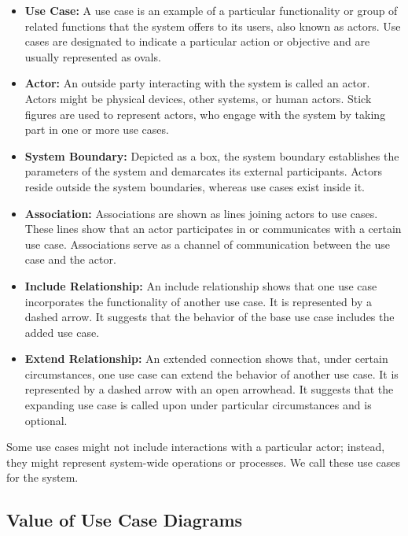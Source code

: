 \begin{itemize}
    \item \textbf{Use Case:} A use case is an example of a particular functionality or group of related functions that the system offers to its users, also known as actors. Use cases are designated to indicate a particular action or objective and are usually represented as ovals.

    \item \textbf{Actor:} An outside party interacting with the system is called an actor. Actors might be physical devices, other systems, or human actors. Stick figures are used to represent actors, who engage with the system by taking part in one or more use cases.

    \item \textbf{System Boundary:} Depicted as a box, the system boundary establishes the parameters of the system and demarcates its external participants. Actors reside outside the system boundaries, whereas use cases exist inside it.

    \item \textbf{Association:} Associations are shown as lines joining actors to use cases. These lines show that an actor participates in or communicates with a certain use case. Associations serve as a channel of communication between the use case and the actor.

    \item \textbf{Include Relationship:} An include relationship shows that one use case incorporates the functionality of another use case. It is represented by a dashed arrow. It suggests that the behavior of the base use case includes the added use case.

    \item \textbf{Extend Relationship:} An extended connection shows that, under certain circumstances, one use case can extend the behavior of another use case. It is represented by a dashed arrow with an open arrowhead. It suggests that the expanding use case is called upon under particular circumstances and is optional.

\end{itemize}
Some use cases might not include interactions with a particular actor; instead, they might represent system-wide operations or processes. We call these use cases for the system.

\subsection{Value of Use Case Diagrams}

